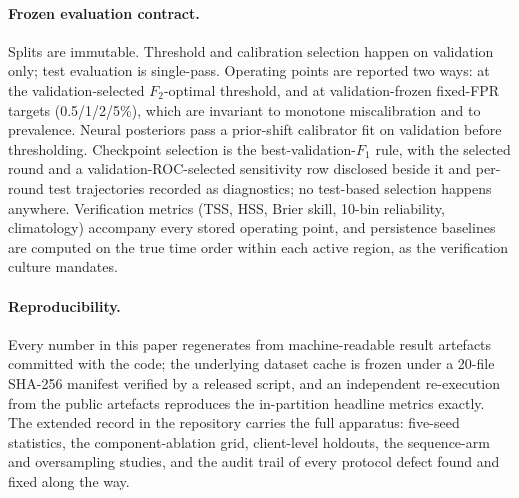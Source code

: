 \paragraph{Frozen evaluation contract.}
Splits are immutable. Threshold and calibration selection happen on
validation only; test evaluation is single-pass. Operating points
are reported two ways: at the validation-selected $F_2$-optimal
threshold, and at validation-frozen fixed-FPR targets (0.5/1/2/5\%),
which are invariant to monotone miscalibration and to prevalence.
Neural posteriors pass a prior-shift calibrator fit on validation
before thresholding. Checkpoint selection is the best-validation-$F_1$
rule, with the selected round and a validation-ROC-selected
sensitivity row disclosed beside it and per-round test trajectories
recorded as diagnostics; no test-based selection happens anywhere.
Verification metrics (TSS, HSS, Brier skill, 10-bin reliability,
climatology) accompany every stored operating point, and persistence
baselines are computed on the true time order within each active
region, as the verification culture mandates.

\paragraph{Reproducibility.}
Every number in this paper regenerates from machine-readable result
artefacts committed with the code; the underlying dataset cache is
frozen under a 20-file SHA-256 manifest verified by a released
script, and an independent re-execution from the public artefacts
reproduces the in-partition headline metrics exactly. The extended
record in the repository carries the full apparatus: five-seed
statistics, the component-ablation grid, client-level holdouts, the
sequence-arm and oversampling studies, and the audit trail of every
protocol defect found and fixed along the way.
